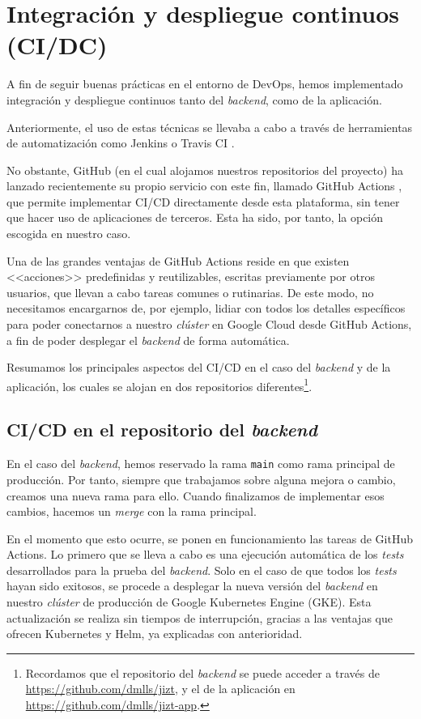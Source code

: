 \section{Integración y despliegue continuos (CI/DC)}

A fin de seguir buenas prácticas en el entorno de DevOps, hemos implementado integración y despliegue continuos tanto del \emph{backend}, como de la aplicación.

Anteriormente, el uso de estas técnicas se llevaba a cabo a través de herramientas de automatización como Jenkins \cite{jenkins} o Travis CI \cite{travis}.

No obstante, GitHub (en el cual alojamos nuestros repositorios del proyecto) ha lanzado recientemente su propio servicio con este fin, llamado GitHub Actions \cite{github-actions}, que permite implementar CI/CD directamente desde esta plataforma, sin tener que hacer uso de aplicaciones de terceros. Esta ha sido, por tanto, la opción escogida en nuestro caso.

Una de las grandes ventajas de GitHub Actions reside en que existen <<acciones>> predefinidas y reutilizables, escritas previamente por otros usuarios, que llevan a cabo tareas comunes o rutinarias. De este modo, no necesitamos encargarnos de, por ejemplo, lidiar con todos los detalles específicos para poder conectarnos a nuestro \emph{clúster} en Google Cloud desde GitHub Actions, a fin de poder desplegar el \emph{backend} de forma automática.

Resumamos los principales aspectos del CI/CD en el caso del \emph{backend} y de la aplicación, los cuales se alojan en dos repositorios diferentes\footnote{Recordamos que el repositorio del \emph{backend} se puede acceder a través de \href{https://github.com/dmlls/jizt}{https://github.com/dmlls/jizt}, y el de la aplicación en \href{https://github.com/dmlls/jizt-app}{https://github.com/dmlls/jizt-app}.}.

\subsection{CI/CD en el repositorio del \emph{backend}}

En el caso del \emph{backend}, hemos reservado la rama \texttt{main} como rama principal de producción. Por tanto, siempre que trabajamos sobre alguna mejora o cambio, creamos una nueva rama para ello. Cuando finalizamos de implementar esos cambios, hacemos un \emph{merge} con la rama principal.

En el momento que esto ocurre, se ponen en funcionamiento las tareas de GitHub Actions. Lo primero que se lleva a cabo es una ejecución automática de los \emph{tests} desarrollados para la prueba del \emph{backend}. Solo en el caso de que todos los \emph{tests} hayan sido exitosos, se procede a desplegar la nueva versión del \emph{backend} en nuestro \emph{clúster} de producción de Google Kubernetes Engine (GKE). Esta actualización se realiza sin tiempos de interrupción, gracias a las ventajas que ofrecen Kubernetes y Helm, ya explicadas con anterioridad.

